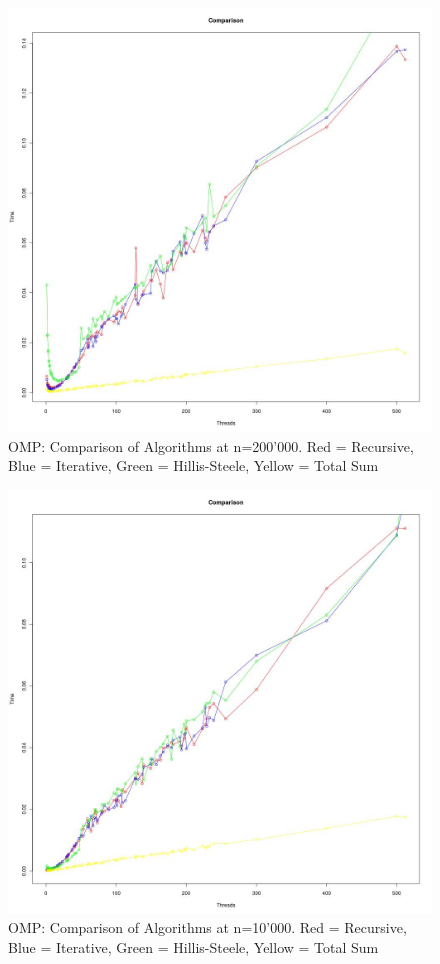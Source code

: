 \documentclass[11pt]{article}
\begin{document}
\begin{figure}[H]
\centering
\caption{OMP: Comparison of Algorithms at n=200'000. Red = Recursive, Blue = Iterative, 
Green = Hillis-Steele, Yellow = Total Sum}

\includegraphics[scale=0.4]{candidate-graphs/omp_p1_compare_200000.jpg}
\end{figure}

\begin{figure}[H]
\centering
\caption{OMP: Comparison of Algorithms at n=10'000. Red = Recursive, Blue = Iterative, 
Green = Hillis-Steele, Yellow = Total Sum}

\includegraphics[scale=0.4]{candidate-graphs/omp_p1_compare_10000.jpg}
\end{figure}
\end{document}
